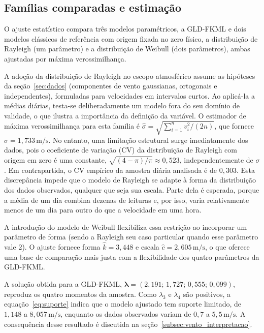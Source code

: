 \subsection{Famílias comparadas e estimação}

O ajuste estatístico compara três modelos paramétricos, a GLD-FKML e dois modelos clássicos de referência com origem fixada no zero físico, a distribuição de Rayleigh (um parâmetro) e a distribuição de Weibull (dois parâmetros), ambas ajustadas por máxima verossimilhança.

A adoção da distribuição de Rayleigh no escopo atmosférico assume as hipóteses da seção~\ref{sec:dados} (componentes de vento gaussianas, ortogonais e independentes), formuladas para velocidades em intervalos curtos. Ao aplicá-la a médias diárias, testa-se deliberadamente um modelo fora do seu domínio de validade, o que ilustra a importância da definição da variável. O estimador de máxima verossimilhança para esta família é $\widehat\sigma = \sqrt{\sum_{i=1}^n v_i^2 / (2n)}$, que fornece $\widehat\sigma = 1,733\,\text{m/s}$. No entanto, uma limitação estrutural surge imediatamente dos dados, pois o coeficiente de variação (CV) da distribuição de Rayleigh com origem em zero é uma constante, $\sqrt{(4-\pi)/\pi} \approx 0,523$, independentemente de $\sigma$. Em contrapartida, o CV empírico da amostra diária analisada é de $0,303$. Esta discrepância impede que o modelo de Rayleigh se adapte à forma da distribuição dos dados observados, qualquer que seja sua escala. Parte dela é esperada, porque a média de um dia combina dezenas de leituras e, por isso, varia relativamente menos de um dia para outro do que a velocidade em uma hora.

A introdução do modelo de Weibull flexibiliza essa restrição ao incorporar um parâmetro de forma (sendo a Rayleigh seu caso particular quando esse parâmetro vale $2$). O ajuste fornece forma $\widehat k = 3,448$ e escala $\widehat c = 2,605\,\text{m/s}$, o que oferece uma base de comparação mais justa com a flexibilidade dos quatro parâmetros da GLD-FKML.

A solução obtida para a GLD-FKML, $\widehat{\boldsymbol\lambda} = (2,191;\, 1,727;\, 0,555;\, 0,099)$, reproduz os quatro momentos da amostra. Como $\lambda_3$ e $\lambda_4$ são positivos, a equação~\eqref{eq:suporte} indica que o modelo ajustado tem suporte limitado, de $1,148$ a $8,057\,\text{m/s}$, enquanto os dados observados variam de $0,7$ a $5,5\,\text{m/s}$. A consequência desse resultado é discutida na seção~\ref{subsec:vento_interpretacao}.

